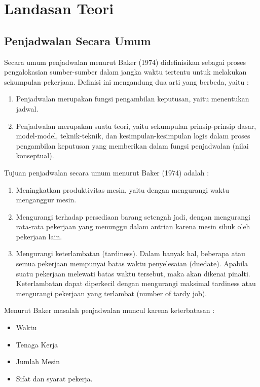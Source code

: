 \chapter{Landasan Teori}
\label{chap:teori}

\section{Penjadwalan Secara Umum}
\label{sec:penjadwalan} 
 Secara umum penjadwalan menurut Baker (1974) didefinisikan sebagai proses pengalokasian sumber-sumber dalam jangka waktu tertentu untuk melakukan sekumpulan pekerjaan. Definisi ini mengandung dua arti yang berbeda, yaitu :
 \begin{enumerate}
 	\item Penjadwalan merupakan fungsi pengambilan keputusan, yaitu menentukan jadwal. 
 	\item Penjadwalan merupakan suatu teori, yaitu sekumpulan prinsip-prinsip dasar, model-model, teknik-teknik, dan kesimpulan-kesimpulan logis dalam proses pengambilan keputusan yang memberikan dalam fungsi penjadwalan (nilai konseptual).
 \end{enumerate}
	Tujuan penjadwalan secara umum menurut Baker (1974) adalah :
\begin{enumerate}
	\item Meningkatkan produktivitas mesin, yaitu dengan mengurangi waktu menganggur mesin.
	\item Mengurangi terhadap persediaan barang setengah jadi, dengan mengurangi rata-rata pekerjaan yang menunggu dalam antrian karena mesin sibuk oleh pekerjaan lain.
	\item Mengurangi keterlambatan (tardiness). Dalam banyak hal, beberapa atau semua pekerjaan mempunyai batas waktu penyelesaian (duedate). Apabila suatu pekerjaan melewati batas waktu tersebut, maka akan dikenai pinalti. Keterlambatan dapat diperkecil dengan mengurangi maksimal tardiness atau mengurangi pekerjaan yang terlambat (number of  tardy job).
\end{enumerate}
	Menurut Baker masalah penjadwalan muncul karena keterbatasan :
	\begin{itemize}
		\item Waktu
		\item Tenaga Kerja
		\item Jumlah Mesin
		\item Sifat dan syarat pekerja.
	\end{itemize}

